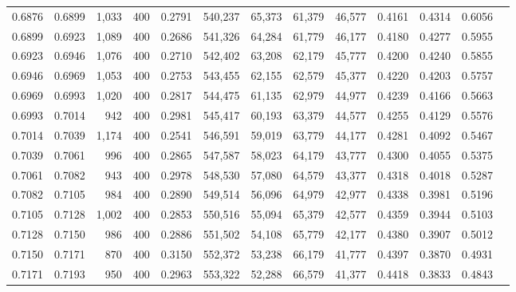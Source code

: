 \begin{tabular}{rrrrrrrrrrrrr}
0.6876 & 0.6899 &  1,033 &   400 &                                     0.2791 & 540,237 &  65,373 &  61,379 &  46,577 & 0.4161 & 0.4314 & 0.6056 \\
0.6899 & 0.6923 &  1,089 &   400 &                                     0.2686 & 541,326 &  64,284 &  61,779 &  46,177 & 0.4180 & 0.4277 & 0.5955 \\
0.6923 & 0.6946 &  1,076 &   400 &                                     0.2710 & 542,402 &  63,208 &  62,179 &  45,777 & 0.4200 & 0.4240 & 0.5855 \\
0.6946 & 0.6969 &  1,053 &   400 &                                     0.2753 & 543,455 &  62,155 &  62,579 &  45,377 & 0.4220 & 0.4203 & 0.5757 \\
0.6969 & 0.6993 &  1,020 &   400 &                                     0.2817 & 544,475 &  61,135 &  62,979 &  44,977 & 0.4239 & 0.4166 & 0.5663 \\
0.6993 & 0.7014 &    942 &   400 &                                     0.2981 & 545,417 &  60,193 &  63,379 &  44,577 & 0.4255 & 0.4129 & 0.5576 \\
0.7014 & 0.7039 &  1,174 &   400 &                                     0.2541 & 546,591 &  59,019 &  63,779 &  44,177 & 0.4281 & 0.4092 & 0.5467 \\
0.7039 & 0.7061 &    996 &   400 &                                     0.2865 & 547,587 &  58,023 &  64,179 &  43,777 & 0.4300 & 0.4055 & 0.5375 \\
0.7061 & 0.7082 &    943 &   400 &                                     0.2978 & 548,530 &  57,080 &  64,579 &  43,377 & 0.4318 & 0.4018 & 0.5287 \\
0.7082 & 0.7105 &    984 &   400 &                                     0.2890 & 549,514 &  56,096 &  64,979 &  42,977 & 0.4338 & 0.3981 & 0.5196 \\
0.7105 & 0.7128 &  1,002 &   400 &                                     0.2853 & 550,516 &  55,094 &  65,379 &  42,577 & 0.4359 & 0.3944 & 0.5103 \\
0.7128 & 0.7150 &    986 &   400 &                                     0.2886 & 551,502 &  54,108 &  65,779 &  42,177 & 0.4380 & 0.3907 & 0.5012 \\
0.7150 & 0.7171 &    870 &   400 &                                     0.3150 & 552,372 &  53,238 &  66,179 &  41,777 & 0.4397 & 0.3870 & 0.4931 \\
0.7171 & 0.7193 &    950 &   400 &                                     0.2963 & 553,322 &  52,288 &  66,579 &  41,377 & 0.4418 & 0.3833 & 0.4843 \\

\end{tabular}
